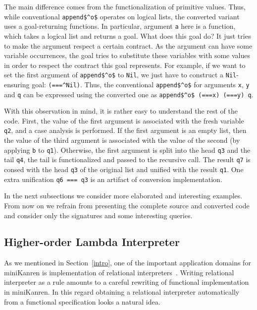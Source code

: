 The main difference comes from the functionalization of primitive values. Thus, while conventional \lstinline|append$^o$| operates
on logical lists, the converted variant uses a goal-returning functions. In particular, argument \lstinline|a| here is a function, 
which takes a logical list and returns a goal. What does this goal do? It just tries to make the argument respect a certain contract.
As the argument can have some variable occurrences, the goal tries to substitute these variables with some values in order to respect
the contract this goal represents. For example, if we want to set the first argument of \lstinline{append$^o$} to \lstinline{Nil}, we just 
have to construct a \lstinline{Nil}-ensuring goal: \lstinline{(===^Nil)}. Thus, the conventional \lstinline{append$^o$} for arguments
\lstinline|x|, \lstinline|y| and \lstinline|q| can be expressed using the converted one as \lstinline{append$^o$ (===x) (===y) q}.

With this observation in mind, it is rather easy to understand the rest of the code. First, the value of the first argument is
associated with the fresh variable \lstinline|q2|, and a case analysis is performed. If the first argument is an empty list, then the 
value of the third argument is associated with the value of the second (by applying \lstinline|b| to \lstinline|q1|). Otherwise, the first
argument is split into the head \lstinline|q3| and the tail \lstinline|q4|, the tail is functionalized and passed to the recursive
call. The result \lstinline|q7| is consed with the head \lstinline|q3| of the original list and unified with the result \lstinline|q1|. One extra
unification \lstinline|q6 === q3| is an artifact of conversion implementation.

In the next subsections we consider more elaborated and interesting examples. From now on we refrain from presenting the complete source and
converted code and consider only the signatures and some interesting queries. 

\subsection{Higher-order Lambda Interpreter}

As we mentioned in Section~\ref{intro}, one of the important application domains for miniKanren is implementation of relational interpreters~\cite{WillThesis,unified,Untagged}. 
Writing relational interpreter as a rule amounts to a careful rewriting of functional implementation in miniKanren. In this regard obtaining a relational
interpreter automatically from a functional specification looks a natural idea.

